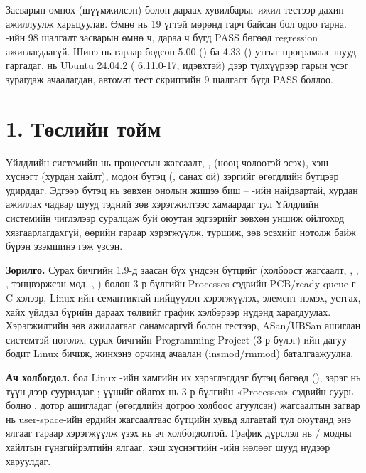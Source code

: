 Засварын өмнөх (шүүмжилсэн) болон дараах хувилбарыг ижил тестээр дахин ажиллуулж харьцуулав. Өмнө нь 19 үгтэй  мөрөнд  \allowbreak{} гарч байсан бол одоо  гарна. -ийн 98 шалгалт засварын өмнө ч, дараа ч бүгд PASS бөгөөд regression ажиглагдаагүй. Шинэ  нь гараар бодсон 5.00 () ба 4.33 () утгыг програмаас шууд гаргадаг.  нь Ubuntu 24.04.2 ( 6.11.0-17,  идэвхтэй) дээр  түлхүүрээр гарын үсэг зурагдаж ачаалагдан, автомат тест скриптийн 9 шалгалт бүгд PASS боллоо.

\section*{1. Төслийн тойм}

Үйлдлийн системийн  нь процессын жагсаалт, ,  (нөөц чөлөөтэй эсэх), хэш хүснэгт (хурдан хайлт), модон бүтэц (, санах ой) зэргийг өгөгдлийн бүтцээр удирддаг. Эдгээр бүтэц нь зөвхөн онолын жишээ биш -- -ийн найдвартай, хурдан ажиллах чадвар шууд тэдний зөв хэрэгжилтээс хамаардаг тул Үйлдлийн системийн чиглэлээр суралцаж буй оюутан эдгээрийг зөвхөн уншиж ойлгоход хязгаарлагдахгүй, өөрийн гараар хэрэгжүүлж, туршиж, зөв эсэхийг нотолж байж бүрэн эзэмшинэ гэж үзсэн.

\textbf{Зорилго.} Сурах бичгийн 1.9-д заасан бүх үндсэн бүтцийг (холбоост жагсаалт, , , , тэнцвэржсэн мод, , ) болон 3-р бүлгийн Processes сэдвийн PCB/ready queue-г C хэлээр, Linux-ийн  семантиктай нийцүүлэн хэрэгжүүлэх, элемент нэмэх, устгах, хайх үйлдэл бүрийн дараах төлвийг график хэлбэрээр нүдэнд харагдуулах. Хэрэгжилтийн зөв ажиллагааг санамсаргүй  болон  тестээр, ASan/UBSan ашиглан системтэй нотолж, сурах бичгийн Programming Project (3-р бүлэг)-ийн дагуу бодит Linux  бичиж, жинхэнэ  орчинд ачаалан (insmod/rmmod) баталгаажуулна.

\textbf{Ач холбогдол.}  бол Linux -ийн хамгийн их хэрэглэгддэг бүтэц бөгөөд  (),  зэрэг нь түүн дээр суурилдаг ; үүнийг ойлгох нь 3-р бүлгийн «Processes» сэдвийн суурь болно .  дотор ашигладаг  (өгөгдлийн  дотроо холбоос агуулсан) жагсаалтын загвар нь user-space-ийн ердийн жагсаалтаас бүтцийн хувьд ялгаатай тул оюутанд энэ ялгааг гараар хэрэгжүүлж үзэх нь ач холбогдолтой. График дүрслэл нь / модны хайлтын гүнзгийрэлтийн ялгааг, хэш хүснэгтийн -ийн нөлөөг шууд нүдээр харуулдаг.

